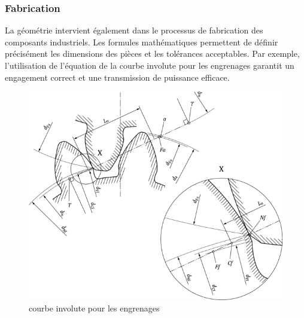 \documentclass{article}
\begin{document}
\subsubsection{Fabrication}
La géométrie intervient également dans le processus de fabrication des composants industriels. Les formules mathématiques permettent de définir précisément les dimensions des pièces et les tolérances acceptables. Par exemple, l'utilisation de l'équation de la courbe involute pour les engrenages garantit un engagement correct et une transmission de puissance efficace.

\begin{figure}[H]
  \centering
  \includegraphics[width =\textwidth]{Tolerance.png}
  \caption{courbe involute pour les engrenages}
  
\end{figure}
\end{document}
